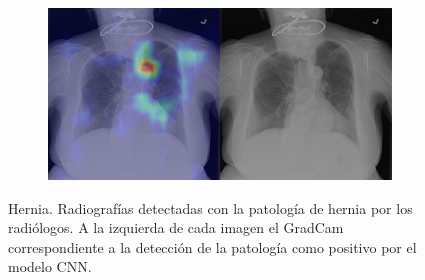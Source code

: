 \begin{figure}[b]
\begin{subfigure}{0.4\textwidth}
    \end{subfigure}
    \begin{subfigure}{0.4\textwidth}
        \centering
        \includegraphics[width=1.0\textwidth]{Chapters/5. Conclusiones/img/Hernia/1_1_00029188_001.png}
    \end{subfigure}

    \caption[short]{Hernia. Radiografías detectadas con la patología de hernia por los
                    radiólogos. A la izquierda de cada imagen el GradCam correspondiente a la detección
                    de la patología como positivo por el modelo CNN.}
\end{figure}


